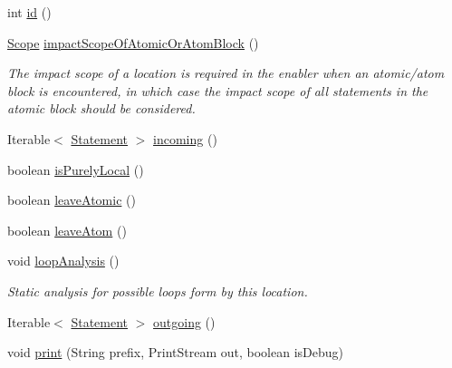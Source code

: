 \begin{DoxyCompactItemize}
int \hyperlink{classedu_1_1udel_1_1cis_1_1vsl_1_1civl_1_1model_1_1common_1_1location_1_1CommonLocation_a5d088542502b3d452887807a05cdd391}{id} ()
\item 
\hyperlink{interfaceedu_1_1udel_1_1cis_1_1vsl_1_1civl_1_1model_1_1IF_1_1Scope}{Scope} \hyperlink{classedu_1_1udel_1_1cis_1_1vsl_1_1civl_1_1model_1_1common_1_1location_1_1CommonLocation_a5c56e154430f58920f04c97fdf1ab407}{impact\+Scope\+Of\+Atomic\+Or\+Atom\+Block} ()
\begin{DoxyCompactList}\small\item\em The impact scope of a location is required in the enabler when an atomic/atom block is encountered, in which case the impact scope of all statements in the atomic block should be considered. \end{DoxyCompactList}\item 
Iterable$<$ \hyperlink{interfaceedu_1_1udel_1_1cis_1_1vsl_1_1civl_1_1model_1_1IF_1_1statement_1_1Statement}{Statement} $>$ \hyperlink{classedu_1_1udel_1_1cis_1_1vsl_1_1civl_1_1model_1_1common_1_1location_1_1CommonLocation_aafcea337248668c348488d07c1022743}{incoming} ()
\item 
boolean \hyperlink{classedu_1_1udel_1_1cis_1_1vsl_1_1civl_1_1model_1_1common_1_1location_1_1CommonLocation_ad3c9de6f56680bf991aaec5149a860d6}{is\+Purely\+Local} ()
\item 
boolean \hyperlink{classedu_1_1udel_1_1cis_1_1vsl_1_1civl_1_1model_1_1common_1_1location_1_1CommonLocation_a7446270538b1504a2b532d7b7e172dda}{leave\+Atomic} ()
\item 
boolean \hyperlink{classedu_1_1udel_1_1cis_1_1vsl_1_1civl_1_1model_1_1common_1_1location_1_1CommonLocation_aca7466a888f9b7dd44a03036d50fc847}{leave\+Atom} ()
\item 
void \hyperlink{classedu_1_1udel_1_1cis_1_1vsl_1_1civl_1_1model_1_1common_1_1location_1_1CommonLocation_ad2d23c44d12f5ed9b9ffe3733def21f1}{loop\+Analysis} ()
\begin{DoxyCompactList}\small\item\em Static analysis for possible loops form by this location. \end{DoxyCompactList}\item 
Iterable$<$ \hyperlink{interfaceedu_1_1udel_1_1cis_1_1vsl_1_1civl_1_1model_1_1IF_1_1statement_1_1Statement}{Statement} $>$ \hyperlink{classedu_1_1udel_1_1cis_1_1vsl_1_1civl_1_1model_1_1common_1_1location_1_1CommonLocation_a20bac21753d1b4a1778340753f0deaf5}{outgoing} ()
\item 
void \hyperlink{classedu_1_1udel_1_1cis_1_1vsl_1_1civl_1_1model_1_1common_1_1location_1_1CommonLocation_af6f7c2c0a34aef048440898b55b88172}{print} (String prefix, Print\+Stream out, boolean is\+Debug)

\end{DoxyCompactItemize}
